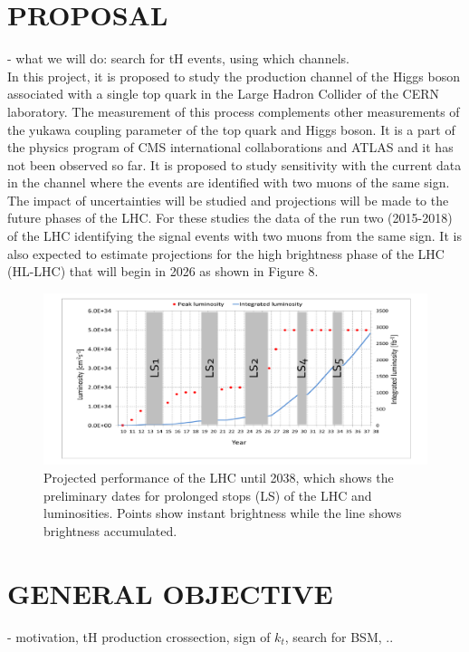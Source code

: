 \documentclass[final,3p]{CSP}
\begin{document}
\section{PROPOSAL}

- what we will do:  search for tH events, using which channels.\\

In this project, it is proposed to study the production channel of the Higgs boson associated 
with a single top quark in the Large Hadron Collider of the CERN laboratory. The measurement 
of this process complements other measurements of the yukawa coupling parameter of the top 
quark and Higgs boson. It is a part of the physics program of CMS international 
collaborations and ATLAS and it has not been observed so far. It is proposed to study 
sensitivity with the current data in the channel where the events are identified with two 
muons of the same sign. The impact of uncertainties will be studied and projections will be 
made to the future phases of the LHC. For these studies the data of the run two (2015-2018) 
of the LHC identifying the signal events with two muons from the same sign. It is also 
expected to estimate projections for the high brightness phase of the LHC (HL-LHC) that will begin 
in 2026 as shown in Figure 8. 

 \begin{figure}[H]
 	\centering
 	\includegraphics[scale=0.45]{./lum6.png}
 	\caption{\onehalfspacing Projected performance of the LHC until 2038, which shows the preliminary dates for prolonged stops (LS) of the LHC and luminosities. Points show instant brightness while the line shows brightness accumulated.}
 	\label{figure 8}
 \end{figure}
\section{GENERAL OBJECTIVE}

- motivation, tH production crossection, sign of $k_t$, search for BSM, ..\\
\end{document}
